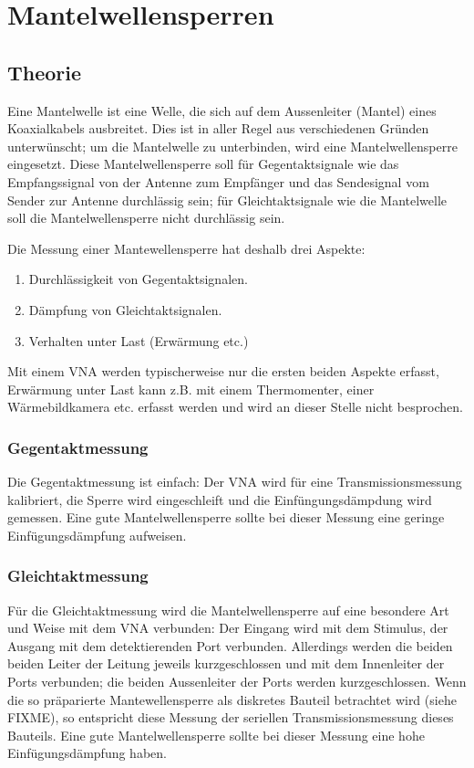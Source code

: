 \documentclass[twoside,a4paper,11pt,halfparskip,DIV=11,notitlepage]{scrartcl}
\begin{document}
\section{Mantelwellensperren}

\subsection{Theorie}

Eine Mantelwelle ist eine Welle, die sich auf dem Aussenleiter (Mantel) eines
Koaxialkabels ausbreitet. Dies ist in aller Regel aus verschiedenen Gründen
unterwünscht; um die Mantelwelle zu unterbinden, wird eine Mantelwellensperre
eingesetzt. Diese Mantelwellensperre soll für Gegentaktsignale wie das
Empfangssignal von der Antenne zum Empfänger und das Sendesignal vom Sender
zur Antenne durchlässig sein; für Gleichtaktsignale wie die Mantelwelle soll
die Mantelwellensperre nicht durchlässig sein.

Die Messung einer Mantewellensperre hat deshalb drei Aspekte:

\begin{enumerate}
    \item Durchlässigkeit von Gegentaktsignalen.
    \item Dämpfung von Gleichtaktsignalen.
    \item Verhalten unter Last (Erwärmung etc.)
\end{enumerate}

Mit einem VNA werden typischerweise nur die ersten beiden Aspekte erfasst,
Erwärmung unter Last kann z.B. mit einem Thermomenter, einer Wärmebildkamera
etc. erfasst werden und wird an dieser Stelle nicht besprochen.

\subsubsection{Gegentaktmessung}\label{sec:gegentaktmessung}

Die Gegentaktmessung ist einfach: Der VNA wird für eine Transmissionsmessung
kalibriert, die Sperre wird eingeschleift und die Einfüngungsdämpdung wird
gemessen. Eine gute Mantelwellensperre sollte bei dieser Messung eine geringe
Einfügungsdämpfung aufweisen.

\subsubsection{Gleichtaktmessung}

Für die Gleichtaktmessung wird die Mantelwellensperre auf eine besondere
Art und Weise mit dem VNA verbunden: Der Eingang wird mit dem Stimulus,
der Ausgang mit dem detektierenden Port verbunden. Allerdings werden die
beiden beiden Leiter der Leitung jeweils kurzgeschlossen und mit dem
Innenleiter der Ports verbunden; die beiden Aussenleiter der Ports werden
kurzgeschlossen. Wenn die so präparierte Mantewellensperre als diskretes
Bauteil betrachtet wird (siehe FIXME), so entspricht diese Messung der
seriellen Transmissionsmessung dieses Bauteils. Eine gute Mantelwellensperre
sollte bei dieser Messung eine hohe Einfügungsdämpfung haben.
\end{document}
